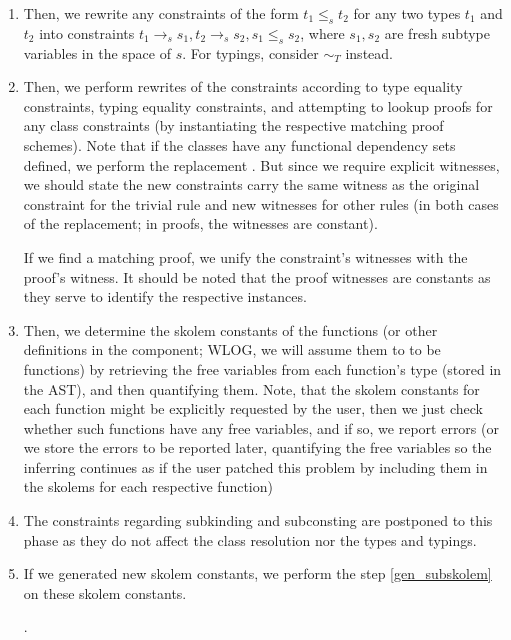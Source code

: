 \begin{enumerate}
\begin{enumerate}
        \item Then, we rewrite any constraints of the form $t_1 \leq_s t_2$ for any two types $t_1$ and $t_2$ into constraints $t_1 \to_s s_1, t_2 \to_s s_2, s_1 \leq_s s_2$, where $s_1, s_2$ are fresh subtype variables in the space of $s$. For typings, consider $\sim_T$ instead.

        \item Then, we perform rewrites of the constraints according to type equality constraints, typing equality constraints, and attempting to lookup proofs for any class constraints (by instantiating the respective matching proof schemes). Note that if the classes have any functional dependency sets defined, we perform the replacement  . But since we require explicit witnesses, we should state the new constraints carry the same witness as the original constraint for the trivial rule and new witnesses for other rules (in both cases of the replacement; in proofs, the witnesses are constant).

        If we find a matching proof, we unify the constraint's witnesses with the proof's witness. It should be noted that the proof witnesses are constants as they serve to identify the respective instances.

        \item Then, we determine the skolem constants of the functions (or other definitions in the component; WLOG, we will assume them to to be functions) by retrieving the free variables from each function's type (stored in the AST), and then quantifying them. Note, that the skolem constants for each function might be explicitly requested by the user, then we just check whether such functions have any free variables, and if so, we report errors (or we store the errors to be reported later, quantifying the free variables so the inferring continues as if the user patched this problem by including them in the skolems for each  respective function) \label{func_skolem}

        \item The constraints regarding subkinding and subconsting are postponed to this phase as they do not affect the class resolution nor the types and typings.

        \item If we generated new skolem constants, we perform the step \ref{gen_subskolem} on these skolem constants.

        .


\end{enumerate}
\end{enumerate}
